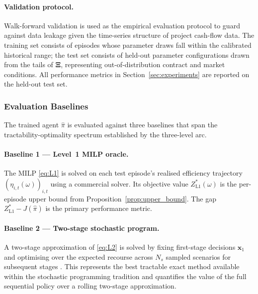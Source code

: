 \paragraph{Validation protocol.}
Walk-forward validation \citep{Cerqueira2020} is used as the empirical
evaluation protocol to guard against data leakage given the
time-series structure of project cash-flow data. The training set
consists of episodes whose parameter draws fall within the calibrated
historical range; the test set consists of held-out parameter
configurations drawn from the tails of $\boldsymbol{\Xi}$,
representing out-of-distribution contract and market conditions. All
performance metrics in Section~\ref{sec:experiments} are reported on
the held-out test set.

\subsubsection{Evaluation Baselines}
\label{subsubsec:l3_baselines}

The trained agent $\hat{\pi}$ is evaluated against three baselines
that span the tractability-optimality spectrum established by the
three-level arc.

\paragraph{Baseline 1 --- Level~1 MILP oracle.}
The MILP \eqref{eq:L1} is solved on each test episode's realised
efficiency trajectory $(\eta_{i,t}(\omega))_{i,t}$ using a
commercial solver. Its objective value $Z^*_{\mathrm{L1}}(\omega)$
is the per-episode upper bound from Proposition~\ref{prop:upper_bound}.
The gap $Z^*_{\mathrm{L1}} - J(\hat{\pi})$ is the primary performance
metric.

\paragraph{Baseline 2 --- Two-stage stochastic program.}
A two-stage approximation of \eqref{eq:L2} is solved by fixing
first-stage decisions $\mathbf{x}_1$ and optimising over the
expected recourse across $N_s$ sampled scenarios for subsequent
stages \citep{Birge2011}. This represents the best tractable exact
method available within the stochastic programming tradition and
quantifies the value of the full sequential policy over a rolling
two-stage approximation.

